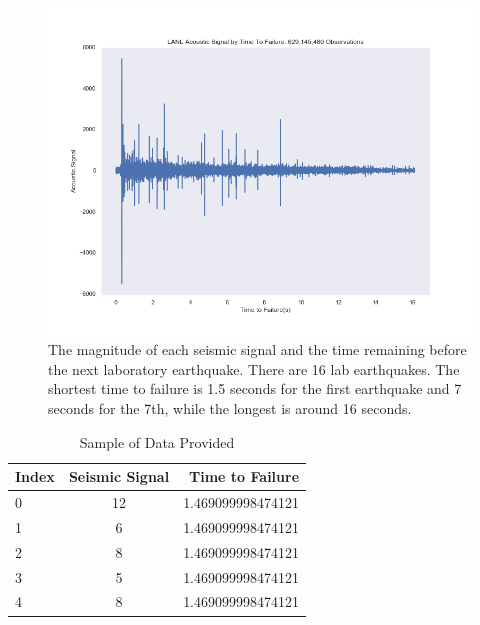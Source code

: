 \documentclass[]{llncs}
\begin{document}
\begin{figure}[h]
	\centering
	\includegraphics[width=1\linewidth]{../GPUProject/allDataDefaultPlot}
	\caption{The magnitude of each seismic signal and the time remaining before the next laboratory earthquake. There are 16 lab earthquakes. The shortest time to failure is 1.5 seconds for the first earthquake and 7 seconds for the 7th, while the longest is around 16 seconds.}
	\label{fig:alldatadefaultplot}
\end{figure}
\begin{table}[h!]
	\begin{center}
		\caption{Sample of Data Provided}
		\label{tab:table1}
		\begin{tabular}{l|c|r} 
			\textbf{Index} & \textbf{Seismic Signal} & \textbf{Time to Failure}\\
			\hline
			0 & 12 & 1.469099998474121 \\ 
			1 & 6 & 1.469099998474121 \\ 
			2 & 8 & 1.469099998474121 \\ 
			3 & 5 & 1.469099998474121 \\ 
			4 & 8 & 1.469099998474121 \\ 
		\end{tabular}
	\end{center}
\end{table}
\end{document}
